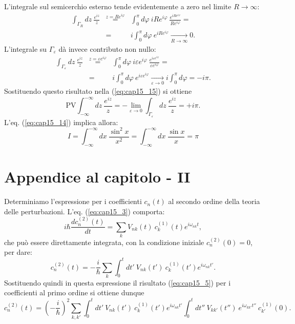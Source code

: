 \documentclass[a4paper,12pt,oneside]{book}
\begin{document}
L'integrale sul semicerchio esterno tende evidentemente a zero nel limite $R\rightarrow \infty $:
\begin{eqnarray}
\int _{\Gamma _{R}} dz\ \frac{e^{iz}}{z} &\overset{z= Re^{i\varphi}}{=}& \int _0 ^{\pi} d\varphi \ i R e^{i\varphi}\ \frac{e^{iRe^{i\varphi}}}{Re^{i\varphi}} = \nonumber\\
&=&i\int _0 ^{\pi} d\varphi \ e^{iRe^{i\varphi}} \underset{R\rightarrow \infty}{\longrightarrow}0.
\end{eqnarray}
L'integrale su $\Gamma _{\varepsilon}$ dà invece contributo non nullo:
\begin{eqnarray}
\int _{\Gamma _{\varepsilon}} dz\ \frac{e^{iz}}{z} &\overset{z= \varepsilon e^{i\varphi}}{=} &\int _0 ^{\pi} d\varphi \ i \varepsilon e^{i\varphi}\ \frac{e^{i\varepsilon e^{i\varphi}}}{\varepsilon e^{i\varphi}} = \nonumber\\
&=&i\int _0 ^{\pi} d\varphi \ e^{i\varepsilon e^{i\varphi}} \underset{\varepsilon\rightarrow 0}{\longrightarrow}i\int _0 ^{\pi} d\varphi = -i\pi.
\end{eqnarray}
Sostituendo questo risultato nella (\ref{eq:cap15_15}) si ottiene
\begin{equation}
\textrm{PV} \int _{-\infty} ^{-\infty} dz\ \frac{e^{iz}}{z} =-\lim _{\varepsilon \rightarrow 0} \int _{\Gamma _{\varepsilon}} dz\ \frac{e^{iz}}{z}= +i\pi.
\end{equation}
L'eq. (\ref{eq:cap15_14}) implica allora:
\begin{equation}
I= \int _{-\infty} ^{-\infty} dx\ \frac{\sin ^2  x}{x^2}= \int _{-\infty} ^{-\infty} dx\ \frac{\sin  x}{x}= \pi
\end{equation}
\newpage
\section*{Appendice al capitolo - II}
Determiniamo l'espressione per i coefficienti $c_n(t)$ al secondo ordine della teoria delle perturbazioni. L'eq. (\ref{eq:cap15_3}) comporta:
\begin{equation}
i\hbar \frac{dc_n ^{(2)} (t)}{dt} = \sum _k V_{nk} (t)\ c_k ^{(1)}(t) e^{i\omega _{nk}t},
\end{equation}
che può essere direttamente integrata, con la condizione iniziale $c_n ^{(2)} (0)=0 $, per dare:
\begin{equation}
c_n ^{(2)} (t)= -\frac{i}{\hbar}\sum _k \int _0 ^t dt'\ V_{nk} (t')\ c_k ^{(1)} (t') e ^{i\omega _{nk} t'}.
\end{equation}
Sostituendo quindi in questa espressione il risultato (\ref{eq:cap15_5}) per i coefficienti al primo ordine si ottiene dunque
\begin{equation}
c_n ^{(2)} (t)= \left(-\frac{i}{\hbar}\right)^2 \sum _{k,k'} \int _0 ^t dt'\ V_{nk} (t')\ c_k ^{(1)} (t') e ^{i\omega _{nk} t'}\int _0 ^t dt''\ V_{kk'} (t'')\  e ^{i\omega _{kk'} t''}\ c_{k'} ^{(1)} (0).
\end{equation}
\end{document}
